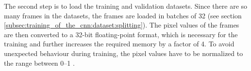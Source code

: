 The second step is to load the training and validation datasets.
Since there are so many frames in the datasets, the frames are loaded in batches of \num{32} (see section \ref{subsec:training_of_the_cnn:dataset:splitting}).
The pixel values of the frames are then converted to a 32-bit floating-point format, which is necessary for the training and further increases the required memory by a factor of \num{4}.
To avoid unexpected behaviour during training, the pixel values have to be normalized to the range between \numrange{0}{1} \cite{}. %


